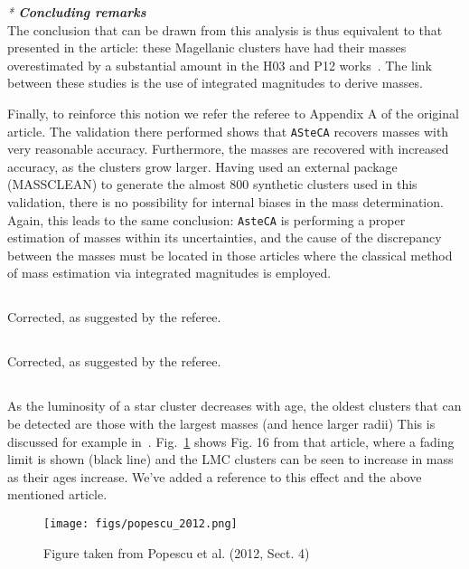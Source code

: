 \documentclass{article}
\begin{document}
\noindent \emph{* \textbf{Concluding remarks}}\\

The conclusion that can be drawn from this analysis is thus equivalent to that
presented in the article: these Magellanic clusters have had their masses
overestimated by a substantial amount in the H03 and P12
works~\citep[and others too, i.e. the][article mentioned by the referee]
{Goudfrooij_2014}.
The link between these studies is the use of integrated magnitudes to derive
masses.

Finally, to reinforce this notion we refer the referee to Appendix A of the
original article.
The validation there performed shows that \texttt{ASteCA} recovers
masses with very reasonable accuracy. Furthermore, the masses are recovered with
increased accuracy, as the clusters grow larger. Having used an external
package (MASSCLEAN) to generate the almost 800 synthetic clusters used in this
validation, there is no possibility for internal biases in the mass
determination.
Again, this leads to the same conclusion: \texttt{AsteCA} is performing a proper
estimation of masses within its uncertainties, and the cause of the discrepancy
between the masses must be located in those articles where the classical method
of mass estimation via integrated magnitudes is employed.


\subsection{}
Corrected, as suggested by the referee.

\subsection{}
Corrected, as suggested by the referee.

\subsection{}
As the luminosity of a star cluster decreases with age, the oldest clusters that
can be detected are those with the largest masses (and hence larger radii)
This is discussed for example in~\citet[][Sect. 4]{Popescu_2012}.
Fig.~\ref{fig:popescu_2012} shows Fig. 16 from that article, where a fading
limit is shown (black line) and the LMC clusters can be seen to increase in mass
as their ages increase.
We've added a reference to this effect and the above mentioned article.

\begin{figure}
    \centering
    \texttt{[image: figs/popescu\_2012.png]}
    \caption{Figure taken from Popescu et al. (2012, Sect. 4)}
\label{fig:popescu_2012}
\end{figure}
\end{document}
